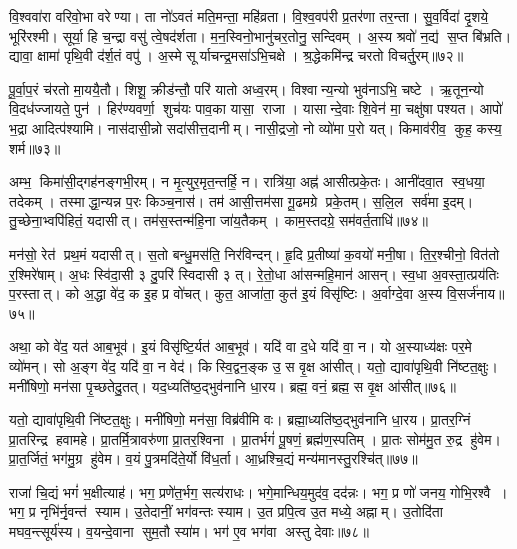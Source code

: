 वि॒श्ववा॑रा वरिवो॒भा वरेण्या।
ता नो॑ऽवतं मति॒मन्ता॒ महि॑व्रता।
वि॒श्व॒वप॑री प्र॒तर॑णा तर॒न्ता।
सु॒व॒र्विदा॑ दृ॒शये॒ भूरि॑रश्मी।
सूर्या॒ हि च॒न्द्रा वसु॑ त्वे॒षद॑र्शता।
म॒न॒स्विनो॒भानु॑चर॒तोनु॒ सन्दिवम्।
अ॒स्य श्रवो॑ न॒द्य॑ स॒प्त बि॑भ्रति।
द्यावा॒ क्षामा॑ पृथि॒वी द॑र्\mbox{}श॒तं वपु॑।
अ॒स्मे सूर्याचन्द्र॒मसा॑ऽभि॒चक्षे।
श्र॒द्धेकमि॑न्द्र चरतो विचर्तु॒रम्॥७२॥

पू॒र्वा॒प॒रं च॑रतो मा॒ययै॒तौ।
शिशू॒ क्रीड॑न्तौ॒ परि॑ यातो अध्व॒रम्।
विश्वान्य॒न्यो भुव॑नाऽभि॒ चष्टे।
ऋ॒तून॒न्यो वि॒दध॑ज्जायते॒ पुन॑।
हिर॑ण्यवर्णा॒ शुच॑यः पाव॒का यासा॒ राजा।
यासान्दे॒वाः शि॒वेन॑ मा॒ चक्षु॑षा पश्यत।
आपो॑ भ॒द्रा आदित्प॑श्यामि।
नास॑दासी॒न्नो सदा॑सीत्त॒दानीम्।
नासी॒द्रजो॒ नो व्यो॑मा प॒रो यत्।
किमाव॑रीव॒ कुह॒ कस्य॒ शर्म\sn{}॥७३॥

अम्भ॒ किमा॑सी॒द्गह॑नङ्गभी॒रम्।
न मृ॒त्युर॒मृत॒न्तर्\mbox{}हि॒ न।
रात्रि॑या॒ अह्न॑ आसीत्प्रके॒तः।
आनी॑दवा॒त स्व॒धया॒ तदेकम्।
तस्माद्धा॒न्यन्न प॒रः किञ्च॒नास॑।
तम॑ आसी॒त्तम॑सा गू॒ढमग्रे प्रके॒तम्।
स॒लि॒ल सर्व॑मा इ॒दम्।
तु॒च्छेना॒भ्वपि॑हितं॒ यदासीत्।
तम॑स॒स्तन्म॑हि॒ना जा॑य॒तैकम्।
काम॒स्तदग्रे॒ सम॑वर्त॒ताधि॑॥७४॥

मन॑सो॒ रेत॑ प्रथ॒मं यदासीत्।
स॒तो बन्धु॒मस॑ति॒ निर॑विन्दन्।
हृ॒दि प्र॒तीष्या॑ क॒वयो॑ मनी॒षा।
ति॒र॒श्चीनो॒ वित॑तो र॒श्मिरे॑षाम्।
अ॒धः स्वि॑दा॒सी ३ दु॒परि॑ स्विदासी ३ त्।
रे॒तो॒धा आ॑सन्महि॒मान॑ आसन्।
स्व॒धा अ॒वस्ता॒त्प्रय॑तिः प॒रस्तात्।
को अ॒द्धा वे॑द॒ क इ॒ह प्र वो॑चत्।
कुत॒ आजा॑ता॒ कुत॑ इ॒यं विसृ॑ष्टिः।
अ॒र्वाग्दे॒वा अ॒स्य वि॒सर्ज॑नाय॥७५॥

अथा॒ को वे॑द॒ यत॑ आब॒भूव॑।
इ॒यं विसृ॑ष्टि॒र्यत॑ आब॒भूव॑।
यदि॑ वा द॒धे यदि॑ वा॒ न।
यो अ॒स्याध्य॑क्षः पर॒मे व्यो॑मन्।
सो अ॒ङ्ग वे॑द॒ यदि॑ वा॒ न वेद॑।
किस्वि॒द्वन॒ङ्क उ॒ स वृ॒क्ष आ॑सीत्।
यतो॒ द्यावा॑पृथि॒वी नि॑ष्टत॒क्षुः।
मनी॑षिणो॒ मन॑सा पृ॒च्छतेदु॒तत्।
यद॒ध्यति॑ष्ठ॒द्भुव॑नानि धा॒रय\sn{}।
ब्रह्म॒ वनं॒ ब्रह्म॒ स वृ॒क्ष आ॑सीत्॥७६॥

यतो॒ द्यावा॑पृथि॒वी नि॑ष्टत॒क्षुः।
मनी॑षिणो॒ मन॑सा॒ विब्र॑वीमि वः।
ब्रह्मा॒ध्यति॑ष्ठ॒द्भुव॑नानि धा॒रय\sn{}।
प्रा॒तर॒ग्निं प्रा॒तरिन्द्र हवामहे।
प्रा॒तर्मि॒त्रावरु॑णा प्रा॒तर॒श्विना।
प्रा॒तर्भगं॑ पू॒षणं॒ ब्रह्म॑ण॒स्पतिम्।
प्रा॒तः सोम॑मु॒त रु॒द्र हु॑वेम।
प्रा॒त॒र्जितं॒ भग॑मु॒ग्र हु॑वेम।
व॒यं पु॒त्रमदि॑ते॒र्यो वि॑ध॒र्ता।
आ॒ध्रश्चि॒द्यं मन्य॑मानस्तु॒रश्चि॑त्॥७७॥

राजा॑ चि॒द्यं भगं॑ भ॒क्षीत्याह॑।
भग॒ प्रणे॑त॒र्भग॒ सत्य॑राधः।
भगे॒मान्धिय॒मुद॑व॒ दद॑न्नः।
भग॒ प्र णो॑ जनय॒ गोभि॒रश्वै।
भग॒ प्र नृभि॑र्नृ॒वन्त॑ स्याम।
उ॒तेदानीं॒ भग॑वन्तः स्याम।
उ॒त प्रपि॒त्व उ॒त मध्ये॒ अह्नाम्।
उ॒तोदि॑ता मघव॒न्त्सूर्य॑स्य।
व॒यन्दे॒वाना सुम॒तौ स्या॑म।
भग॑ ए॒व भग॑वा अस्तु देवाः॥७८॥

